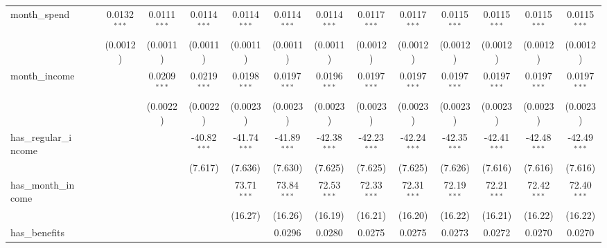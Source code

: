 \begin{table}[htbp]
\begin{tabular}{lcccccccccccccc}
      month\_spend            &                 &                 & 0.0132$^{***}$  & 0.0111$^{***}$  & 0.0114$^{***}$  & 0.0114$^{***}$  & 0.0114$^{***}$  & 0.0114$^{***}$  & 0.0117$^{***}$  & 0.0117$^{***}$  & 0.0115$^{***}$  & 0.0115$^{***}$  & 0.0115$^{***}$  & 0.0115$^{***}$\\
                               &                 &                 & (0.0012)        & (0.0011)        & (0.0011)        & (0.0011)        & (0.0011)        & (0.0011)        & (0.0012)        & (0.0012)        & (0.0012)        & (0.0012)        & (0.0012)        & (0.0012)\\
      month\_income           &                 &                 &                 & 0.0209$^{***}$  & 0.0219$^{***}$  & 0.0198$^{***}$  & 0.0197$^{***}$  & 0.0196$^{***}$  & 0.0197$^{***}$  & 0.0197$^{***}$  & 0.0197$^{***}$  & 0.0197$^{***}$  & 0.0197$^{***}$  & 0.0197$^{***}$\\
                               &                 &                 &                 & (0.0022)        & (0.0022)        & (0.0023)        & (0.0023)        & (0.0023)        & (0.0023)        & (0.0023)        & (0.0023)        & (0.0023)        & (0.0023)        & (0.0023)\\
      has\_regular\_income   &                 &                 &                 &                 & -40.82$^{***}$  & -41.74$^{***}$  & -41.89$^{***}$  & -42.38$^{***}$  & -42.23$^{***}$  & -42.24$^{***}$  & -42.35$^{***}$  & -42.41$^{***}$  & -42.48$^{***}$  & -42.49$^{***}$\\
                               &                 &                 &                 &                 & (7.617)         & (7.636)         & (7.630)         & (7.625)         & (7.625)         & (7.625)         & (7.626)         & (7.616)         & (7.616)         & (7.616)\\
      has\_month\_income     &                 &                 &                 &                 &                 & 73.71$^{***}$   & 73.84$^{***}$   & 72.53$^{***}$   & 72.33$^{***}$   & 72.31$^{***}$   & 72.19$^{***}$   & 72.21$^{***}$   & 72.42$^{***}$   & 72.40$^{***}$\\
                               &                 &                 &                 &                 &                 & (16.27)         & (16.26)         & (16.19)         & (16.21)         & (16.20)         & (16.22)         & (16.21)         & (16.22)         & (16.22)\\
      has\_benefits           &                 &                 &                 &                 &                 &                 & 0.0296          & 0.0280          & 0.0275          & 0.0275          & 0.0273          & 0.0272          & 0.0270          & 0.0270\\

\end{tabular}
\end{table}

